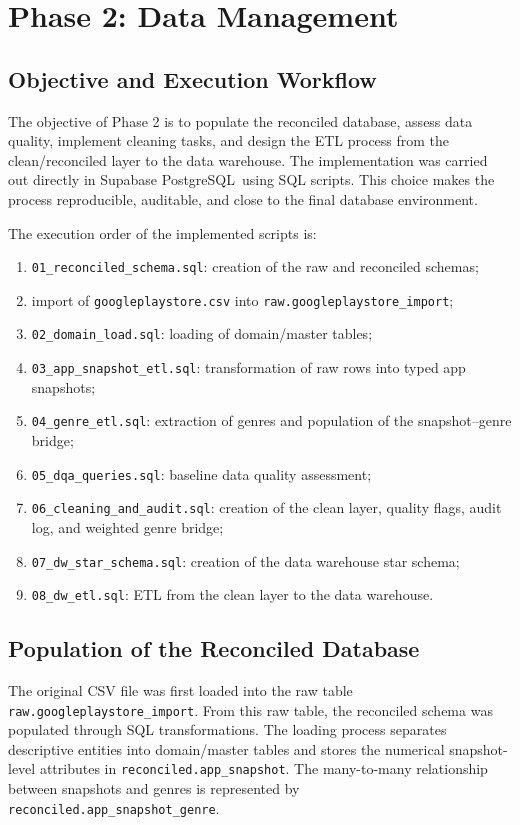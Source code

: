 \documentclass[11pt,a4paper]{article}
\newcommand{\dbms}{Supabase PostgreSQL}
\begin{document}
\section{Phase 2: Data Management}

\subsection{Objective and Execution Workflow}
The objective of Phase 2 is to populate the reconciled database, assess data quality, implement cleaning tasks, and design the ETL process from the clean/reconciled layer to the data warehouse. The implementation was carried out directly in \dbms\ using SQL scripts. This choice makes the process reproducible, auditable, and close to the final database environment.

The execution order of the implemented scripts is:
\begin{enumerate}[leftmargin=1.5em]
    \item \texttt{01\_reconciled\_schema.sql}: creation of the raw and reconciled schemas;
    \item import of \texttt{googleplaystore.csv} into \texttt{raw.googleplaystore\_import};
    \item \texttt{02\_domain\_load.sql}: loading of domain/master tables;
    \item \texttt{03\_app\_snapshot\_etl.sql}: transformation of raw rows into typed app snapshots;
    \item \texttt{04\_genre\_etl.sql}: extraction of genres and population of the snapshot--genre bridge;
    \item \texttt{05\_dqa\_queries.sql}: baseline data quality assessment;
    \item \texttt{06\_cleaning\_and\_audit.sql}: creation of the clean layer, quality flags, audit log, and weighted genre bridge;
    \item \texttt{07\_dw\_star\_schema.sql}: creation of the data warehouse star schema;
    \item \texttt{08\_dw\_etl.sql}: ETL from the clean layer to the data warehouse.
\end{enumerate}

\subsection{Population of the Reconciled Database}
The original CSV file was first loaded into the raw table \texttt{raw.googleplaystore\_import}. From this raw table, the reconciled schema was populated through SQL transformations. The loading process separates descriptive entities into domain/master tables and stores the numerical snapshot-level attributes in \texttt{reconciled.app\_snapshot}. The many-to-many relationship between snapshots and genres is represented by \texttt{reconciled.app\_snapshot\_genre}.
\end{document}
